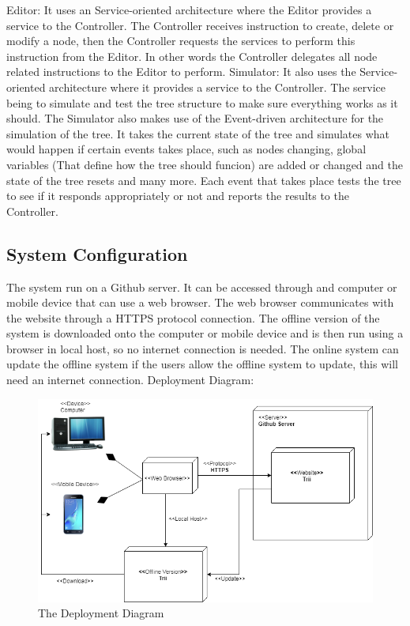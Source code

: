 \documentclass[12pt]{article}
\begin{document}
      Editor: It uses an Service-oriented architecture where the Editor provides a service to the Controller. The Controller receives instruction to create, delete or modify a node, then the Controller requests the services to perform this instruction from the Editor. In other words the Controller delegates all node related instructions to the Editor to perform.\newline \newline 
      Simulator: It also uses the Service-oriented architecture where it provides a service to the Controller. The service being to simulate and test the tree structure to make sure everything works as it should. The Simulator also makes use of the Event-driven architecture for the simulation of the tree. It takes the current state of the tree and simulates what would happen if certain events takes place, such as nodes changing, global variables (That define how the tree should funcion) are added or changed and the state of the tree resets and many more. Each event that takes place tests the tree to see if it responds appropriately or not and reports the results to the Controller.
  
    \subsection{System Configuration} 
      The system run on a Github server. It can be accessed through and computer or mobile device that can use a web browser. The web browser communicates with the website through a HTTPS protocol connection. The offline version of the system is downloaded onto the computer or mobile device and is then run using a browser in local host, so no internet connection is needed. The online system can update the offline system if the users allow the offline system to update, this will need an internet connection.\newline \newline 
      Deployment Diagram:
      
      \begin{figure}[H]
        \includegraphics[width=\linewidth]{images/TriiDeploymentDiagram}
        \caption{The Deployment Diagram}
        \label{fig:deploymentdiagram}
      \end{figure}
  
  
\end{document}

